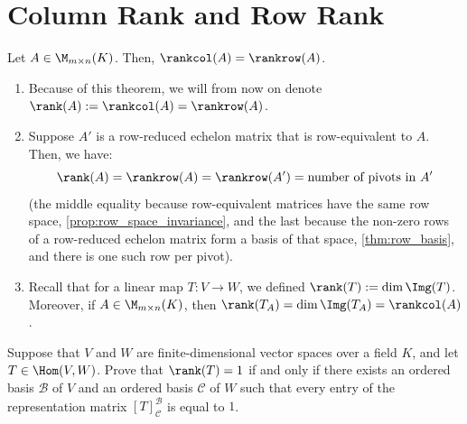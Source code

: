 \renewcommand{\thetheorem}{17.c.\arabic{theorem}}
\setcounter{theorem}{0}


\section{Column Rank and Row Rank}
\label{sec:column_row_rank}

\begin{theorem}
\label{thm:rank_row_column_equality}
Let $A \in \M_{m \times n}(K)$. Then, $\rankcol(A) = \rankrow(A)$.
\end{theorem}

\begin{remark}
\label{rem:rank_notation_and_properties}
\begin{enumerate}
    \item Because of this theorem, we will from now on denote $\rank(A) := \rankcol(A) = \rankrow(A)$.
    \item Suppose $A'$ is a row-reduced echelon matrix that is row-equivalent to $A$. Then, we have:
    \begin{equation*}
        \rank(A) = \rankrow(A) = \rankrow(A') = \text{number of pivots in } A'
    \end{equation*}
    (the middle equality because row-equivalent matrices have the same row space, \cref{prop:row_space_invariance}, and the last because the non-zero rows of a row-reduced echelon matrix form a basis of that space, \cref{thm:row_basis}, and there is one such row per pivot).
    \item Recall that for a linear map $T: V \to W$, we defined $\rank(T) := \dim \Img(T)$. Moreover, if $A \in \M_{m \times n}(K)$, then $\rank(T_A) = \dim \Img(T_A) = \rankcol(A)$.
\end{enumerate}
\end{remark}

\begin{exercise}
\label{exc:rank_one_all_ones_matrix}
Suppose that $V$ and $W$ are finite-di\-men\-sional vector spaces over a field $K$, and let $T \in \Hom(V, W)$.
Prove that $\rank(T) = 1$ if and only if there exists an ordered basis $\mathcal{B}$ of $V$ and an ordered basis $\mathcal{C}$ of $W$ such that every entry of the representation matrix $[T]_{\mathcal{C}}^{\mathcal{B}}$ is equal to $1$.
\end{exercise}

